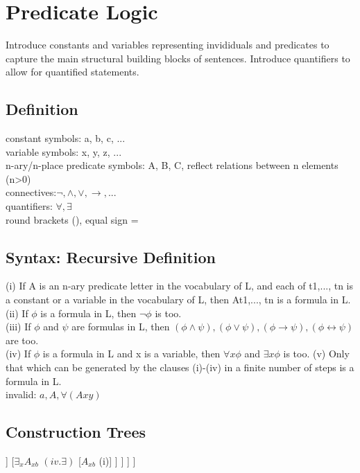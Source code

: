 \section{Predicate Logic}
Introduce constants and variables representing invididuals and predicates to capture the main structural building blocks of sentences. Introduce quantifiers to allow for quantified statements. 
\subsection*{Definition}
constant symbols: a, b, c, ... \\
variable symbols: x, y, z, ... \\
n-ary/n-place predicate symbols: A, B, C, reflect relations between n elements (n>0) \\
connectives:$\neg, \land, \lor, \to, ...$ \\
quantifiers: $\forall, \exists$ \\
round brackets (), equal sign =
\subsection*{Syntax: Recursive Definition}
(i) If A is an n-ary predicate letter in the vocabulary of L, and each of t1,..., tn is a constant or a variable in the vocabulary of L, then At1,..., tn is a formula in L.\\
(ii) If $\phi$ is a formula in L, then $\neg \phi$ is too.\\
(iii) If $\phi$ and $\psi$ are formulas in L, then $(\phi \land \psi), (\phi \lor \psi), (\phi \to \psi), (\phi \leftrightarrow \psi)$ are too.\\
(iv) If $\phi$ is a formula in L and x is a variable, then $\forall x \phi$ and $\exists x \phi$ is too.
(v) Only that which can be generated by the clauses (i)-(iv) in a finite
number of steps is a formula in L.\\
invalid: $a, A, \forall(Axy)$ 
\subsection*{Construction Trees}
\begin{forest}
[$\forall_x \forall_y ((A_{xy} \land B_y) \to \exists_x A_{xb})$ $(iv. \forall)$
	[$\forall_y ((A_{xy} \land B_y) \to \exists_x A_{xb})$ $(iv. \forall)$
		[$(A_{xy} \land B_y) \to \exists_x A_{xb}$ $(iii. \to)$
			[$A_{xy} \land B_y$ $(iii. \land)$
				[$A_{xy}$ (i)]
				[$B_y$ (i)]
			]
			[$\exists_x A_{xb}$ $(iv. \exists)$
				[$A_{xb}$ (i)]
			]
		]
	]
]
\end{forest}
